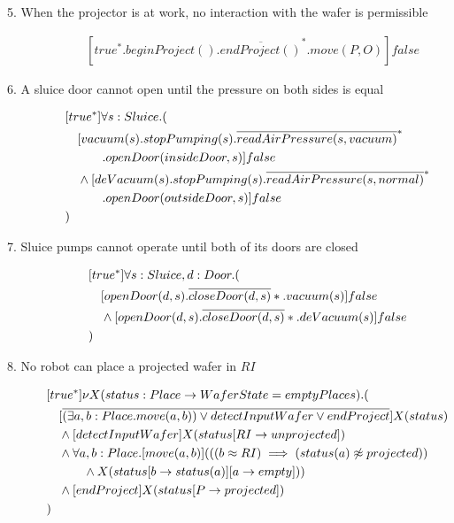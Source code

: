 \begin{description}
 
 \item[5. When the projector is at work, no interaction with the wafer is permissible]
 	\begin{align*}
 		&[true^*.beginProject().\overline{endProject()}^*.move(P,O)]false
	\end{align*}
	
 \item[6. A sluice door cannot open until the pressure on both sides is equal]
	\begin{align*}
&[true^*]\forall s:Sluice . ( \\
&\tab  [vacuum(s).stopPumping(s).\overline{readAirPressure(s, vacuum)}^*\\
&\tab\tab\tab.openDoor(insideDoor,s)]false \\
&\tab  \wedge [deVacuum(s).stopPumping(s).\overline{readAirPressure(s, normal)}^*\\
&\tab\tab\tab.openDoor(outsideDoor,s)]false \\
&)		
	\end{align*}
	
 \item[7. Sluice pumps cannot operate until both of its doors are closed]
 
 \begin{align*}
 &[true^*]\forall s:Sluice, d:Door . ( \\
 &\hspace{1em} [openDoor(d,s).\overline{closeDoor(d,s)}*.vacuum(s)]false \\
 &\hspace{1em} \wedge [openDoor(d,s).\overline{closeDoor(d,s)}*.deVacuum(s)]false \\
 &)
 \end{align*}

 \item[8. No robot can place a projected wafer in $RI$]

\begin{align*}
&[true^*] \nu X(status:Place \to WaferState=emptyPlaces).( \\
&\tab  [\overline{(\exists a,b:Place.move(a,b)) \vee detectInputWafer \vee endProject}]X(status) \\
&\tab  \wedge [detectInputWafer]X(status[RI \to unprojected]) \\
&\tab  \wedge \forall a,b:Place.[move(a, b)](((b \approx RI) \implies (status(a) \not \approx projected)) \\
&\tab\tab\tab \wedge X(status[b \to status(a)][a \to empty])) \\
&\tab  \wedge [endProject]X(status[P \to projected]) \\
&)
\end{align*}


\end{description}
